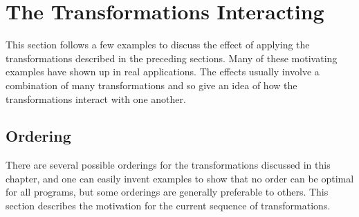 \section{The Transformations Interacting}

This section follows a few examples to discuss the effect of applying the
transformations described in the preceding sections. Many of these motivating
examples have shown up in real applications. The effects usually involve a
combination of many transformations and so give an idea of how the
transformations interact with one another.

\subsection{Ordering}

There are several possible orderings for the transformations discussed in this
chapter, and one can easily invent examples to show that no order can be optimal
for all programs, but some orderings are generally preferable to others. This
section describes the motivation for the current sequence of transformations.

